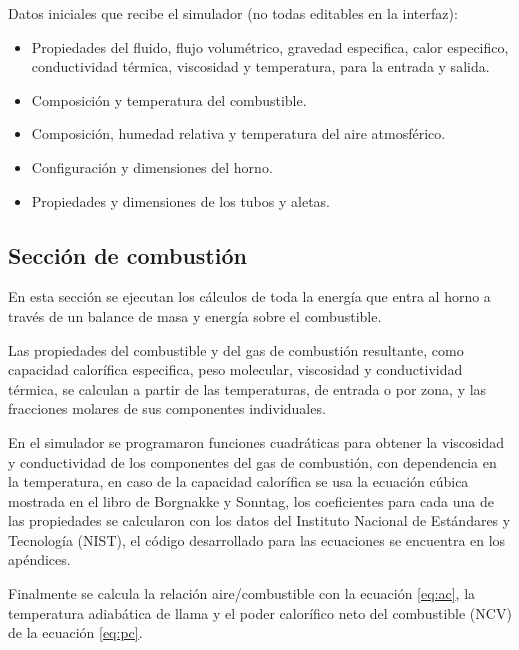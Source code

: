 \par Datos iniciales que recibe el simulador (no todas editables en la interfaz):
\begin{itemize}
    \item Propiedades del fluido, flujo volumétrico, gravedad especifica, calor especifico, conductividad térmica, viscosidad y temperatura, para la entrada y salida.
    \item Composición y temperatura del combustible.
    \item Composición, humedad relativa y temperatura del aire atmosférico.
    \item Configuración y dimensiones del horno.
    \item Propiedades y dimensiones de los tubos y aletas.
\end{itemize}

\subsection{Sección de combustión}
\par En esta sección se ejecutan los cálculos de toda la energía que entra al horno a través de un balance de masa y energía sobre el combustible.
\par Las propiedades del combustible y del gas de combustión resultante, como capacidad calorífica especifica, peso molecular, viscosidad y conductividad térmica, se calculan a partir de las temperaturas, de entrada o por zona, y las fracciones molares de sus componentes individuales.
\par En el simulador se programaron funciones cuadráticas para obtener la viscosidad y conductividad de los componentes del gas de combustión, con dependencia en la temperatura, en caso de la capacidad calorífica se usa la ecuación cúbica mostrada en el libro de Borgnakke y Sonntag\cite{bib:vanwylen}, los coeficientes para cada una de las propiedades se calcularon con los datos del Instituto Nacional de Estándares y Tecnología (NIST)\cite{nist}, el código desarrollado para las ecuaciones se encuentra en los apéndices. 
\par Finalmente se calcula la relación aire/combustible con la ecuación \ref{eq:ac}, la temperatura adiabática de llama y el poder calorífico neto del combustible (NCV) de la ecuación \ref{eq:pc}.


